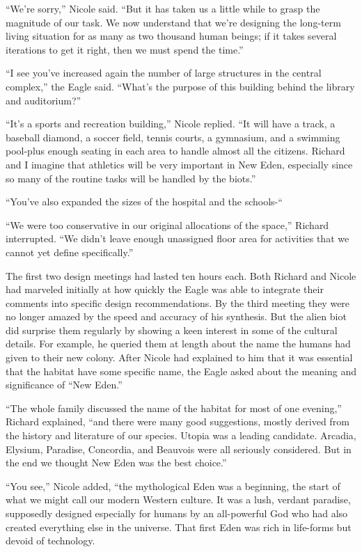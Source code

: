 \documentclass[]{article}
\begin{document}
{“We’re sorry,” Nicole said. “But it has taken us a little while to grasp the magnitude of our task. We now understand that we’re designing the long-term living situation for as many as two thousand human beings; if it takes several iterations to get it right, then we must spend the time.”

“I see you’ve increased again the number of large structures in the central complex,” the Eagle said. “What’s the purpose of this building behind the library and auditorium?”

“It’s a sports and recreation building,” Nicole replied. “It will have a track, a baseball diamond, a soccer field, tennis courts, a gymnasium, and a swimming pool-plus enough seating in each area to handle almost all the citizens. Richard and I imagine that athletics will be very important in New Eden, especially since so many of the routine tasks will be handled by the biots.”

“You’ve also expanded the sizes of the hospital and the schools-“

“We were too conservative in our original allocations of the space,” Richard interrupted. “We didn’t leave enough unassigned floor area for activities that we cannot yet define specifically.”

The first two design meetings had lasted ten hours each. Both Richard and Nicole had marveled initially at how quickly the Eagle was able to integrate their comments into specific design recommendations. By the third meeting they were no longer amazed by the speed and accuracy of his synthesis. But the alien biot did surprise them regularly by showing a keen interest in some of the cultural details. For example, he queried them at length about the name the humans had given to their new colony. After Nicole had explained to him that it was essential that the habitat have some specific name, the Eagle asked about the meaning and significance of “New Eden.”

“The whole family discussed the name of the habitat for most of one evening,” Richard explained, “and there were many good suggestions, mostly derived from the history and literature of our species. Utopia was a leading candidate. Arcadia, Elysium, Paradise, Concordia, and Beauvois were all seriously considered. But in the end we thought New Eden was the best choice.”

“You see,” Nicole added, “the mythological Eden was a beginning, the start of what we might call our modern Western culture. It was a lush, verdant paradise, supposedly designed especially for humans by an all-powerful God who had also created everything else in the universe. That first Eden was rich in life-forms but devoid of technology.

}
\end{document}
